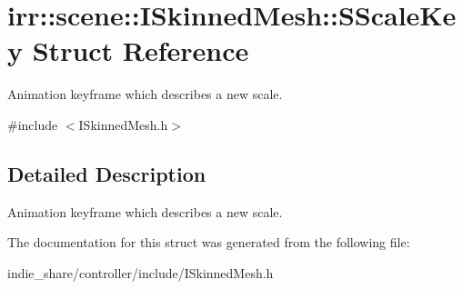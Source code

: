 \hypertarget{structirr_1_1scene_1_1ISkinnedMesh_1_1SScaleKey}{}\section{irr\+:\+:scene\+:\+:I\+Skinned\+Mesh\+:\+:S\+Scale\+Key Struct Reference}
\label{structirr_1_1scene_1_1ISkinnedMesh_1_1SScaleKey}


Animation keyframe which describes a new scale.  




{\ttfamily \#include $<$I\+Skinned\+Mesh.\+h$>$}



\subsection{Detailed Description}
Animation keyframe which describes a new scale. 

The documentation for this struct was generated from the following file\+:\begin{DoxyCompactItemize}
\item 
indie\+\_\+share/controller/include/I\+Skinned\+Mesh.\+h\end{DoxyCompactItemize}
